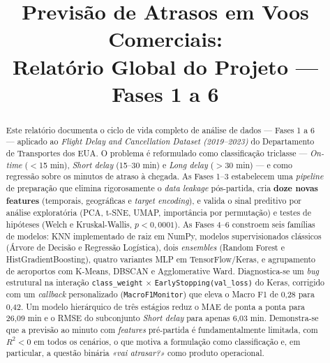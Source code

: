 \documentclass[conference]{IEEEtran}
\begin{document}
\title{Previsão de Atrasos em Voos Comerciais:\\Relatório Global do Projeto — Fases 1 a 6}

\author{
\and
{}
}

\maketitle

\begin{abstract}
Este relatório documenta o ciclo de vida completo de análise de dados —
Fases 1 a 6 — aplicado ao \textit{Flight Delay and Cancellation Dataset
(2019–2023)} do Departamento de Transportes dos EUA. O problema é
reformulado como classificação triclasse — \textit{On-time} ($<$15 min),
\textit{Short delay} (15–30 min) e \textit{Long delay} ($>$30 min) — e como
regressão sobre os minutos de atraso à chegada. As Fases 1–3 estabelecem
uma \textit{pipeline} de preparação que elimina rigorosamente o \textit{data
leakage} pós-partida, cria \textbf{doze novas features} (temporais,
geográficas e \textit{target encoding}), e valida o sinal preditivo por análise
exploratória (PCA, t-SNE, UMAP, importância por permutação) e testes de
hipóteses (Welch e Kruskal-Wallis, $p<0{,}0001$). As Fases 4–6 constroem seis
famílias de modelos: KNN implementado de raiz em NumPy, modelos supervisionados
clássicos (Árvore de Decisão e Regressão Logística), dois \textit{ensembles}
(Random Forest e HistGradientBoosting), quatro variantes MLP em
TensorFlow/Keras, e agrupamento de aeroportos com K-Means, DBSCAN e
Agglomerative Ward. Diagnostica-se um \textit{bug} estrutural na interação
\texttt{class\_weight} $\times$ \texttt{EarlyStopping(val\_loss)} do Keras,
corrigido com um \textit{callback} personalizado (\texttt{MacroF1Monitor}) que
eleva o Macro F1 de 0,28 para 0,42. Um modelo hierárquico de três estágios
reduz o MAE de ponta a ponta para 26,09 min e o RMSE do subconjunto
\textit{Short delay} para apenas 6,03 min. Demonstra-se que a previsão ao
minuto com \textit{features} pré-partida é fundamentalmente limitada, com
$R^2<0$ em todos os cenários, o que motiva a formulação como classificação e,
em particular, a questão binária \textit{«vai atrasar?»} como produto
operacional.
\end{abstract}
\end{document}
